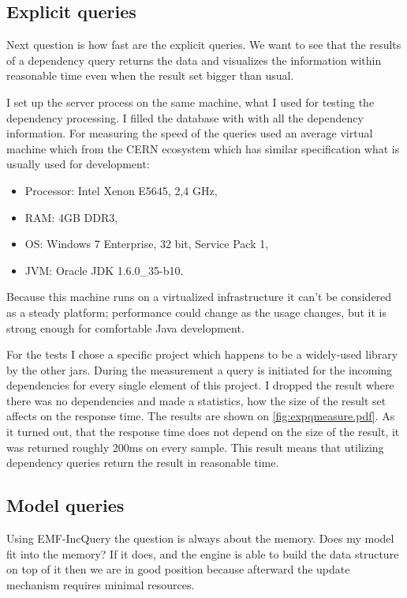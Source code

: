 \subsection{Explicit queries}
\label{sect:explqueries}
Next question is how fast are the explicit queries. We want to see that the
results of a dependency query returns the data and visualizes the information
within reasonable time even when the result set bigger than usual. 

I set up the server process on the same machine, what I used for 
testing the dependency processing. I filled the database with with all the
dependency information. For measuring the speed of the queries used an average
virtual machine which from the CERN ecosystem which has similar specification
what is usually used for development:
\begin{itemize}
  \item Processor: Intel Xenon E5645, 2,4 GHz,
  \item RAM: 4GB DDR3,
  \item OS: Windows 7 Enterprise, 32 bit, Service Pack 1,
  \item JVM: Oracle JDK 1.6.0\_35-b10.
\end{itemize}
Because this machine runs on a virtualized infrastructure it can't be
considered as a steady platform; performance could change as the usage changes,
but it is strong enough for comfortable Java development. 

For the tests I chose a specific project which happens to be a widely-used
library by the other jars. During the measurement a query is initiated for 
the incoming dependencies for every single element of this project. 
I dropped the result where there was no dependencies and made a statistics, how 
the size of the result set affects on the response time.
The results are shown on \autoref{fig:expqmeasure.pdf}.
As it turned out, that the response time does not depend on the size of the result,
it was returned roughly 200ms on every sample. This result means that utilizing 
dependency queries return the result in reasonable time. 


\subsection{Model queries}
Using EMF-IncQuery the question is always about the memory. Does my model fit into
the memory? If it does, and the engine is able to build the data structure on top
of it then we are in good position because afterward the update mechanism requires 
minimal resources. 

